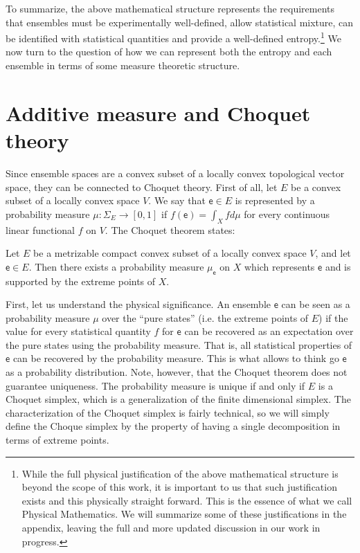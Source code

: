 \documentclass[10pt,twocolumn, nofootinbib]{revtex4-2}
\newcommand{\ens}[1][e] {\mathsf{#1}} %
\begin{document}
To summarize, the above mathematical structure represents the requirements that ensembles must be experimentally well-defined, allow statistical mixture, can be identified with statistical quantities and provide a well-defined entropy.\footnote{While the full physical justification of the above mathematical structure is beyond the scope of this work, it is important to us that such justification exists and this physically straight forward. This is the essence of what we call Physical Mathematics. We will summarize some of these justifications in the appendix, leaving the full and more updated discussion in our work in progress.} We now turn to the question of how we can represent both the entropy and each ensemble in terms of some measure theoretic structure.

\section{Additive measure and Choquet theory}

Since ensemble spaces are a convex subset of a locally convex topological vector space, they can be connected to Choquet theory. First of all, let $E$ be a convex subset of a locally convex space $V$. We say that $\ens \in E$ is represented by a probability measure $\mu : \Sigma_{E} \to [0,1]$ if $f(\ens) = \int_X f d\mu$ for every continuous linear functional $f$ on $V$. The Choquet theorem states:
\begin{thrm}[Choquet]
	Let $E$ be a metrizable compact convex subset of a locally convex space $V$, and let $\ens \in E$. Then there exists a probability measure $\mu_{\ens}$ on $X$ which represents $\ens$ and is supported by the extreme points of $X$.
\end{thrm}

First, let us understand the physical significance. An ensemble $\ens$ can be seen as a probability measure $\mu$ over the ``pure states'' (i.e. the extreme points of $E$) if the value for every statistical quantity $f$ for $\ens$ can be recovered as an expectation over the pure states using the probability measure. That is, all statistical properties of $\ens$ can be recovered by the probability measure. This is what allows to think go $\ens$ as a probability distribution. Note, however, that the Choquet theorem does not guarantee uniqueness. The probability measure is unique if and only if $E$ is a Choquet simplex, which is a generalization of the finite dimensional simplex. The characterization of the Choquet simplex is fairly technical, so we will simply define the Choque simplex by the property of having a single decomposition in terms of extreme points.
\end{document}
